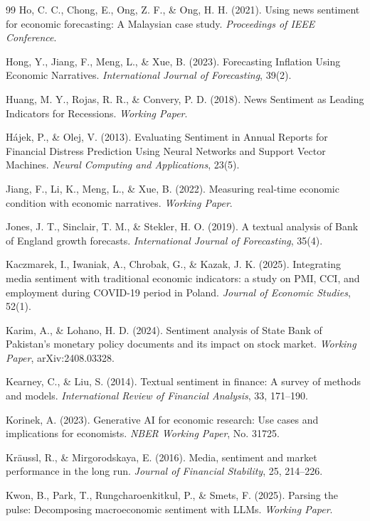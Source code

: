 \documentclass[12pt,oneside]{article}
\begin{document}
\begin{thebibliography}{99}
 Ho, C. C., Chong, E., Ong, Z. F., \& Ong, H. H. (2021). Using news sentiment for economic forecasting: A Malaysian case study. \textit{Proceedings of IEEE Conference}.

 Hong, Y., Jiang, F., Meng, L., \& Xue, B. (2023). Forecasting Inflation Using Economic Narratives. \textit{International Journal of Forecasting}, 39(2).

 Huang, M. Y., Rojas, R. R., \& Convery, P. D. (2018). News Sentiment as Leading Indicators for Recessions. \textit{Working Paper}.

 Hájek, P., \& Olej, V. (2013). Evaluating Sentiment in Annual Reports for Financial Distress Prediction Using Neural Networks and Support Vector Machines. \textit{Neural Computing and Applications}, 23(5).

 Jiang, F., Li, K., Meng, L., \& Xue, B. (2022). Measuring real-time economic condition with economic narratives. \textit{Working Paper}.

 Jones, J. T., Sinclair, T. M., \& Stekler, H. O. (2019). A textual analysis of Bank of England growth forecasts. \textit{International Journal of Forecasting}, 35(4).

 Kaczmarek, I., Iwaniak, A., Chrobak, G., \& Kazak, J. K. (2025). Integrating media sentiment with traditional economic indicators: a study on PMI, CCI, and employment during COVID-19 period in Poland. \textit{Journal of Economic Studies}, 52(1).

 Karim, A., \& Lohano, H. D. (2024). Sentiment analysis of State Bank of Pakistan's monetary policy documents and its impact on stock market. \textit{Working Paper}, arXiv:2408.03328.

 Kearney, C., \& Liu, S. (2014). Textual sentiment in finance: A survey of methods and models. \textit{International Review of Financial Analysis}, 33, 171--190.

 Korinek, A. (2023). Generative AI for economic research: Use cases and implications for economists. \textit{NBER Working Paper}, No. 31725.

 Kräussl, R., \& Mirgorodskaya, E. (2016). Media, sentiment and market performance in the long run. \textit{Journal of Financial Stability}, 25, 214--226.

 Kwon, B., Park, T., Rungcharoenkitkul, P., \& Smets, F. (2025). Parsing the pulse: Decomposing macroeconomic sentiment with LLMs. \textit{Working Paper}.


\end{thebibliography}
\end{document}
